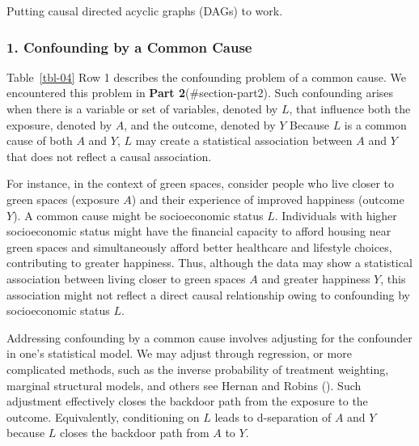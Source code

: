 \documentclass[
  singlecolumn]{article}
\begin{document}
\begin{table}

\caption{\label{tbl-04}Putting causal directed acyclic graphs (DAGs) to
work.}

\centering{

\terminologyelconfoundersLONG

}

\end{table}%

\subsubsection{1. Confounding by a Common
Cause}\label{confounding-by-a-common-cause}

Table~\ref{tbl-04} Row 1 describes the confounding problem of a common
cause. We encountered this problem in \textbf{Part 2}(\#section-part2).
Such confounding arises when there is a variable or set of variables,
denoted by \(L\), that influence both the exposure, denoted by \(A\),
and the outcome, denoted by \(Y\) Because \(L\) is a common cause of
both \(A\) and \(Y\), \(L\) may create a statistical association between
\(A\) and \(Y\) that does not reflect a causal association.

For instance, in the context of green spaces, consider people who live
closer to green spaces (exposure \(A\)) and their experience of improved
happiness (outcome \(Y\)). A common cause might be socioeconomic status
\(L\). Individuals with higher socioeconomic status might have the
financial capacity to afford housing near green spaces and
simultaneously afford better healthcare and lifestyle choices,
contributing to greater happiness. Thus, although the data may show a
statistical association between living closer to green spaces \(A\) and
greater happiness \(Y\), this association might not reflect a direct
causal relationship owing to confounding by socioeconomic status \(L\).

Addressing confounding by a common cause involves adjusting for the
confounder in one's statistical model. We may adjust through regression,
or more complicated methods, such as the inverse probability of
treatment weighting, marginal structural models, and others see Hernan
and Robins (). Such adjustment
effectively closes the backdoor path from the exposure to the outcome.
Equivalently, conditioning on \(L\) leads to d-separation of \(A\) and
\(Y\) because \(\boxed{L}\) closes the backdoor path from \(A\) to
\(Y\).
\end{document}
